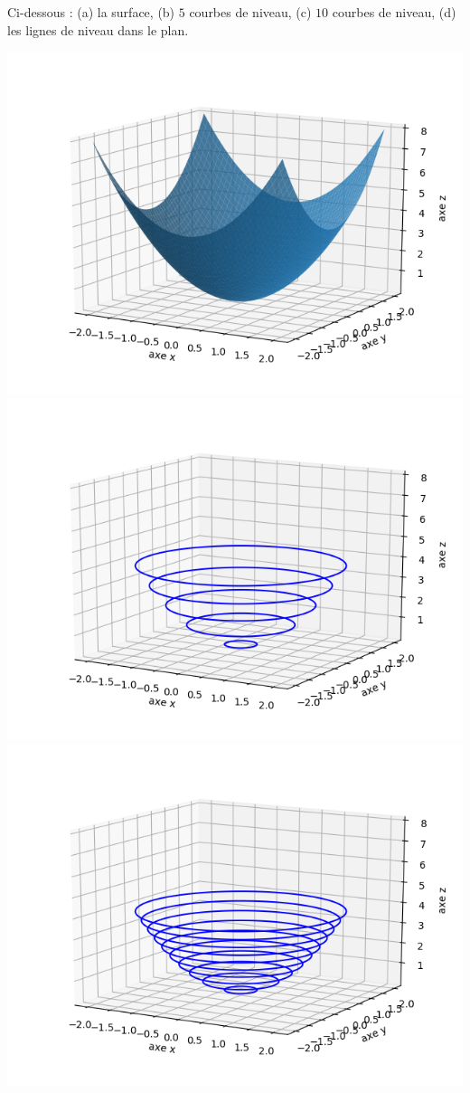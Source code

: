 \documentclass[11pt,class=report,crop=false]{standalone}
\begin{document}
\begin{exemple}
Ci-dessous : (a) la surface, (b) $5$ courbes de niveau, (c) $10$ courbes de niveau, (d) les lignes de niveau dans le plan.
\begin{center}
\includegraphics[scale=\myscale,scale=0.5]{figures/fonctions-niveau-1a}
\includegraphics[scale=\myscale,scale=0.5]{figures/fonctions-niveau-1b}
\includegraphics[scale=\myscale,scale=0.5]{figures/fonctions-niveau-1c}

\end{center}
\end{exemple}
\end{document}
